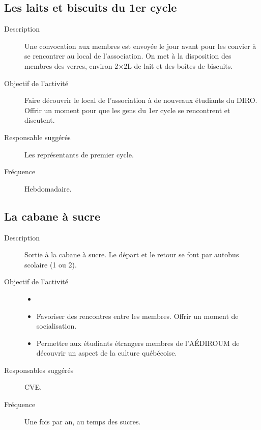 \documentclass{aediroum}
\begin{document}
\subsection{Les laits et biscuits du 1er cycle}
\begin{description}
	\item[Description] Une convocation aux membres est envoyée le jour avant pour les convier à se rencontrer au local de l'association. On met à la disposition des membres des verres, environ 2$\times$2L de lait et des boîtes de biscuits.
	\item[Objectif de l'activité] Faire découvrir le local de l'association à de nouveaux étudiants du DIRO. Offrir un moment pour que les gens du 1er cycle se rencontrent et discutent.
	\item[Responsable suggérés] Les représentants de premier cycle.
	\item[Fréquence] Hebdomadaire.
\end{description}

\subsection{La cabane à sucre}
\begin{description}
	\item[Description] Sortie à la cabane à sucre. Le départ et le retour se font par autobus scolaire (1 ou 2).
	\item[Objectif de l'activité]
	\begin{itemize}
		\item[]
		\item Favoriser des rencontres entre les membres. Offrir un moment de socialisation.
		\item Permettre aux étudiants étrangers membres de l'AÉDIROUM de découvrir un aspect de la culture québécoise.
	\end{itemize}
	\item[Responsables suggérés] CVE.
	\item[Fréquence] Une fois par an, au temps des sucres.
\end{description}
\end{document}
